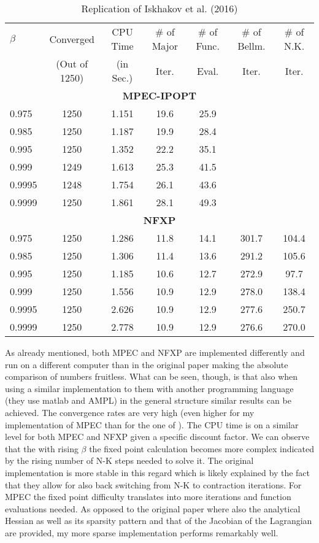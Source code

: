\begin{table}[H]
	\centering
	\caption{Replication of Iskhakov et al. (2016)}
	\label{table1}
	\begin{tabular}{l c c c c c c}
		\toprule\midrule
		$\beta$ & Converged  & CPU Time & \# of Major & \# of Func. & \# of Bellm. & \# of N.K.   \\
		& (Out of 1250) & (in Sec.) & Iter. & Eval. & Iter. & Iter. \\
		\midrule
		\multicolumn{7}{c}{\textbf{MPEC-IPOPT}} \\
		0.975 & 1250 & 1.151 & 19.6 & 25.9 \\
		0.985 & 1250 & 1.187 & 19.9 & 28.4 \\
		0.995 & 1250 & 1.352 & 22.2 & 35.1 \\
		0.999 & 1249 & 1.613 & 25.3 & 41.5 \\
		0.9995 & 1248 & 1.754 & 26.1 & 43.6 \\
		0.9999 & 1250 & 1.861 & 28.1 & 49.3 \\
		\multicolumn{7}{c}{\textbf{NFXP}} \\
		0.975 & 1250 & 1.286 & 11.8 & 14.1 & 301.7 & 104.4 \\
		0.985 & 1250 & 1.306 & 11.4 & 13.6 & 291.2 & 105.6 \\
		0.995 & 1250 & 1.185 & 10.6 & 12.7 & 272.9 & 97.7 \\
		0.999 & 1250  & 1.556 & 10.9 & 12.9 & 278.0 & 138.4 \\
		0.9995 & 1250 & 2.626 & 10.9 & 12.9 & 277.6 & 250.7 \\
		0.9999 & 1250 & 2.778 & 10.9 & 12.9 & 276.6 & 270.0 \\
		\bottomrule
	\end{tabular}
\end{table}

As already mentioned, both MPEC and NFXP are implemented differently and run on a different computer than in the original paper making the absolute comparison of numbers fruitless. What can be seen, though, is that also when using a similar implementation to them with another programming language (they use matlab and AMPL) in the general structure similar results can be achieved. The convergence rates are very high (even higher for my implementation of MPEC than for the one of \citeauthor{Iskhakov.2016}). The CPU time is on a similar level for both MPEC and NFXP given a specific discount factor. We can observe that the with rising $\beta$ the fixed point calculation becomes more complex indicated by the rising number of N-K steps needed to solve it. The original implementation is more stable in this regard which is likely explained by the fact that they allow for also back switching from N-K to contraction iterations. For MPEC the fixed point difficulty translates into more iterations and function evaluations needed. As opposed to the original paper where also the analytical Hessian as well as its sparsity pattern and that of the Jacobian of the Lagrangian are provided, my more sparse implementation performs remarkably well.

